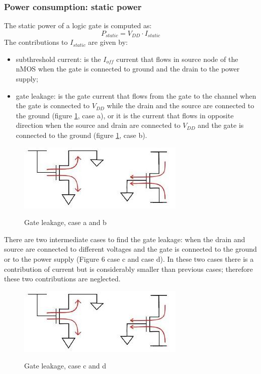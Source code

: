 \subsubsection{Power consumption: static power}\label{ha_stat_pow}
The static power of a logic gate is computed as:
\begin{equation}
P_{static} = V_{DD}\cdot I_{static}
\end{equation}
The contributions to $I_{static}$ are given by:
\begin{itemize}
	\item subthreshold current: is the $I_{off}$ current that flows in source node of the nMOS when the gate is connected to ground and the drain to the power supply;
	\item gate leakage: is the gate current that flows from the gate to the channel when the gate is connected to $V_{DD}$ while the drain and the source are connected to the ground (figure \ref{gate_leak}, case a), or it is the current that flows in opposite direction when the source and drain are connected to $V_{DD}$ and the gate is connected to the ground (figure \ref{gate_leak}, case b).
\end{itemize}
\begin{figure}[h]
	\caption{Gate leakage, case a and b}
	\includegraphics{img/gate_leakage.png}
	\centering
	\label{gate_leak}
\end{figure}
There are two intermediate cases to find the gate leakage: when the drain and source are connected to different voltages and the gate is connected to the ground or to the power supply (Figure 6 case c and case d). In these two cases there is a contribution of current but is considerably smaller than previous cases; therefore these two contributions are neglected.
\begin{figure}[htbp]
	\caption{Gate leakage, case c and d}
	\includegraphics{img/gate_leakage.png}
	\centering
	\label{gate_leak2}
\end{figure}


